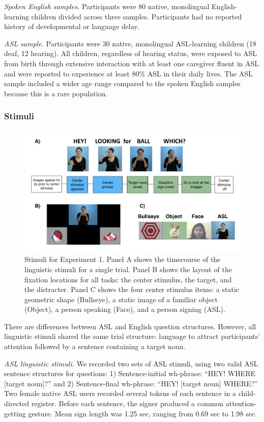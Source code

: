 \documentclass[english,floatsintext,man]{apa6}
\theoremstyle{definition}
\theoremstyle{definition}
\theoremstyle{definition}
\theoremstyle{remark}
\begin{document}
\emph{Spoken English samples.} Participants were 80 native, monolingual
English-learning children divided across three samples. Participants had
no reported history of developmental or language delay.

\emph{ASL sample.} Participants were 30 native, monolingual ASL-learning
children (18 deaf, 12 hearing). All children, regardless of hearing
status, were exposed to ASL from birth through extensive interaction
with at least one caregiver fluent in ASL and were reported to
experience at least 80\% ASL in their daily lives. The ASL sample
included a wider age range compared to the spoken English samples
because this is a rare population.

\hypertarget{stimuli}{%
\subsubsection{Stimuli}\label{stimuli}}

\begin{figure}[tb]

{\centering \includegraphics[width=0.7\linewidth]{figs/trio-stim-1} 

}

\caption{Stimuli for Experiment 1. Panel A shows the timecourse of the linguistic stimuli for a single trial. Panel B shows the layout of the fixation locations for all tasks: the center stimulus, the target, and the distracter. Panel C shows the four center stimulus items: a static geometric shape (Bullseye), a static image of a familiar object (Object), a person speaking (Face), and a person signing (ASL).}\label{fig:trio-stim}
\end{figure}

There are differences between ASL and English question structures.
However, all linguistic stimuli shared the same trial structure:
language to attract participants' attention followed by a sentence
containing a target noun.

\emph{ASL linguistic stimuli.} We recorded two sets of ASL stimuli,
using two valid ASL sentence structures for questions: 1)
Sentence-initial wh-phrase: \enquote{HEY! WHERE {[}target noun{]}?} and
2) Sentence-final wh-phrase: \enquote{HEY! {[}target noun{]} WHERE?} Two
female native ASL users recorded several tokens of each sentence in a
child-directed register. Before each sentence, the signer produced a
common attention-getting gesture. Mean sign length was 1.25 sec, ranging
from 0.69 sec to 1.98 sec.
\end{document}
